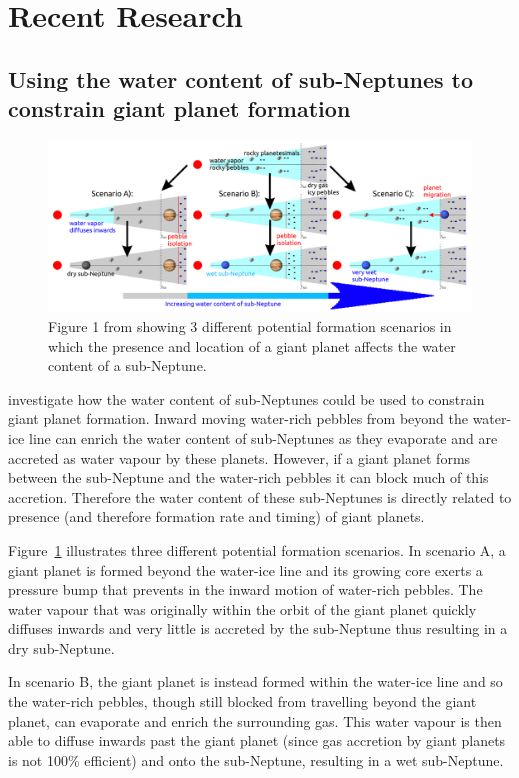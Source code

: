 \documentclass[twocolumn]{aastex631}
\begin{document}
\section{Recent Research}

\subsection{Using the water content of sub-Neptunes to constrain giant planet formation}

\begin{figure}
    \centering
    \includegraphics[width=\textwidth]{water_cartoon.png}
    \caption{Figure 1 from \citet{Bitsch+2021} showing 3 different potential formation scenarios in which the presence and location of a giant planet affects the water content of a sub-Neptune.}
    \label{fig:water}
\end{figure}

\citet{Bitsch+2021} investigate how the water content of sub-Neptunes could be used to constrain giant planet formation. Inward moving water-rich pebbles from beyond the water-ice line can enrich the water content of sub-Neptunes as they evaporate and are accreted as water vapour by these planets. However, if a giant planet forms between the sub-Neptune and the water-rich pebbles it can block much of this accretion. Therefore the water content of these sub-Neptunes is directly related to presence (and therefore formation rate and timing) of giant planets.

Figure~\ref{fig:water} illustrates three different potential formation scenarios. In scenario A, a giant planet is formed beyond the water-ice line and its growing core exerts a pressure bump that prevents in the inward motion of water-rich pebbles. The water vapour that was originally within the orbit of the giant planet quickly diffuses inwards and very little is accreted by the sub-Neptune thus resulting in a dry sub-Neptune.

In scenario B, the giant planet is instead formed within the water-ice line and so the water-rich pebbles, though still blocked from travelling beyond the giant planet, can evaporate and enrich the surrounding gas. This water vapour is then able to diffuse inwards past the giant planet (since gas accretion by giant planets is not 100\% efficient) and onto the sub-Neptune, resulting in a wet sub-Neptune.
\end{document}
